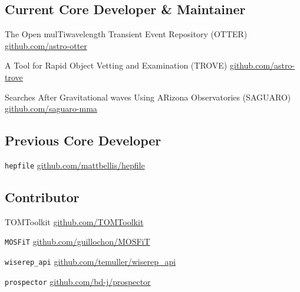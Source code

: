 \documentclass[a4paper, 12pt]{article}
\begin{document}
\subsection{{Current Core Developer \& Maintainer}}

The Open mulTiwavelength Transient Event Repository (OTTER) \hfill \href{https://github.com/astro-otter}{github.com/astro-otter}

A Tool for Rapid Object Vetting and Examination (TROVE) \hfill \href{https://github.com/astro-trove}{github.com/astro-trove}

Searches After Gravitational waves Using ARizona Observatories (SAGUARO) \hfill \href{https://github.com/saguaro-mma}{github.com/saguaro-mma}

\vspace*{6pt}
\subsection{{Previous Core Developer}}

{\tt hepfile} \hfill \href{https://github.com/mattbellis/hepfile/}{github.com/mattbellis/hepfile}

\vspace*{6pt}
\subsection{{Contributor}}

TOMToolkit \hfill \href{https://github.com/TOMToolkit/}{github.com/TOMToolkit}

{\tt MOSFiT} \hfill \href{https://github.com/guillochon/MOSFiT}{github.com/guillochon/MOSFiT}

{\tt wiserep\_api} \hfill \href{https://github.com/temuller/wiserep_api}{github.com/temuller/wiserep\_api}

{\tt prospector} \hfill \href{https://github.com/bd-j/prospector}{github.com/bd-j/prospector}
\end{document}
